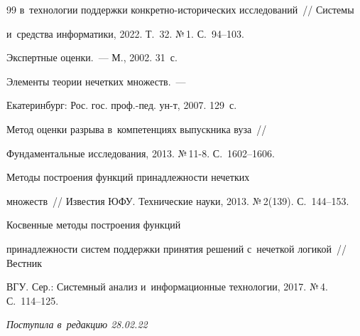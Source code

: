 {{\begin{thebibliography}{99}
в~технологии поддержки кон\-крет\-но-ис\-то\-ри\-че\-ских исследований~/\!\!/ Системы 


и~средства информатики, 2022. Т.~32. №\,1. С.~94--103.




   Экспертные оценки.~--- М., 2002. 31~с.




   Элементы теории нечетких множеств.~--- 


  Екатеринбург: Рос. гос. проф.-пед. ун-т, 2007. 129~с.




   Метод оценки разрыва в~компетенциях выпускника вуза~/\!\!/ 


Фундаментальные исследования, 2013. №\,11-8. С.~1602--1606. 




   Методы построения функций принадлежности нечетких 


множеств~/\!\!/ Известия ЮФУ. Технические науки, 2013. №\,2(139). С.~144--153. 




   Косвенные методы построения функций 


принадлежности сис\-тем поддержки принятия решений с~нечеткой логикой~/\!\!/ Вестник 


ВГУ. Сер.: Сис\-тем\-ный анализ и~информационные технологии, 2017. №\,4. С.~114--125.


       \end{thebibliography}


} }











\vspace*{-3pt}





\hfill{\small\textit{Поступила в~редакцию 28.02.22}}
















